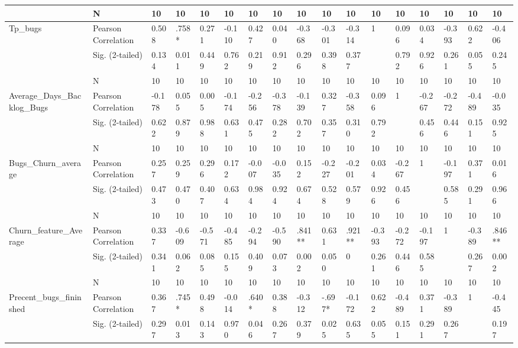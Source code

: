 \documentclass[UKenglish]{ifimaster}  %
\begin{document}
\begin{table}[!htbp]
\begin{adjustwidth}{-2.5cm}{}
{\begin{tabular}{ | l | l | l | l | l | l | l | l | l | l | l | l | l | l | l | l | l | }
	 & N & 10 & 10 & 10 & 10 & 10 & 10 & 10 & 10 & 10 & 10 & 10 & 10 & 10 & 10 & 10 \\ \hline
	Tp\_bugs & Pearson Correlation & 0.508 & .758* & 0.271 & -0.110 & 0.427 & 0.040 & -0.368 & -0.301 & -0.314 & 1 & 0.096 & 0.034 & -0.393 & 0.622 & -0.406\\ \hline
	 & Sig. (2-tailed) & 0.134 & 0.011 & 0.449 & 0.762 & 0.219 & 0.912 & 0.296 & 0.398 & 0.377 &  & 0.792 & 0.926 & 0.261 & 0.055 & 0.245\\ \hline
	 & N & 10 & 10 & 10 & 10 & 10 & 10 & 10 & 10 & 10 & 10 & 10 & 10 & 10 & 10 & 10 \\ \hline
	Average\_Days\_Backlog\_Bugs & Pearson Correlation & -0.178 & 0.055 & 0.005 & -0.174 & -0.256 & -0.378 & -0.139 & 0.327 & -0.358 & 0.096 & 1 & -0.267 & -0.272 & -0.489 & -0.035\\ \hline
	 & Sig. (2-tailed) & 0.622 & 0.879 & 0.988 & 0.631 & 0.475 & 0.282 & 0.702 & 0.357 & 0.310 & 0.792 &  & 0.456 & 0.446 & 0.151 & 0.925\\ \hline
	 & N & 10 & 10 & 10 & 10 & 10 & 10 & 10 & 10 & 10 & 10 & 10 & 10 & 10 & 10 & 10 \\ \hline
	Bugs\_Churn\_average & Pearson Correlation & 0.257 & 0.259 & 0.296 & 0.172 & -0.007 & -0.035 & 0.152 & -0.227 & -0.201 & 0.034 & -0.267 & 1 & -0.197 & 0.371 & 0.016\\ \hline
	 & Sig. (2-tailed) & 0.473 & 0.470 & 0.407 & 0.634 & 0.984 & 0.924 & 0.674 & 0.528 & 0.579 & 0.926 & 0.456 &  & 0.585 & 0.291 & 0.966\\ \hline
	 & N & 10 & 10 & 10 & 10 & 10 & 10 & 10 & 10 & 10 & 10 & 10 & 10 & 10 & 10 & 10 \\ \hline
	Churn\_feature\_Average & Pearson Correlation & 0.337 & -0.609 & -0.571 & -0.485 & -0.294 & -0.590 & .841** & 0.631 & .921** & -0.393 & -0.272 & -0.197 & 1 & -0.389 & .846** \\ \hline
	 & Sig. (2-tailed) & 0.341 & 0.062 & 0.085 & 0.155 & 0.409 & 0.073 & 0.002 & 0.050 & 0 & 0.261 & 0.446 & 0.585 &  & 0.267 & 0.002\\ \hline
	 & N & 10 & 10 & 10 & 10 & 10 & 10 & 10 & 10 & 10 & 10 & 10 & 10 & 10 & 10 & 10 \\ \hline
	Precent\_bugs\_fininshed & Pearson Correlation & 0.367 & .745* & 0.498 & -0.014 & .640* & 0.388 & -0.312 & -.697* & -0.172 & 0.622 & -0.489 & 0.371 & -0.389 & 1 & -0.445\\ \hline
	 & Sig. (2-tailed) & 0.297 & 0.013 & 0.143 & 0.970 & 0.046 & 0.267 & 0.379 & 0.025 & 0.635 & 0.055 & 0.151 & 0.291 & 0.267 &  & 0.197\\ \hline

\end{tabular}}
\end{adjustwidth}
\end{table}
\end{document}
